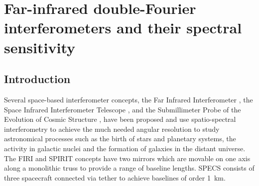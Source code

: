 
\chapter[Far-IR double-Fourier interferometers and their spectral sensitivity]{Far-infrared double-Fourier interferometers and their spectral sensitivity} %

\label{chap:phasenoisepaper} %


\section{Introduction}

Several space-based interferometer concepts, the Far Infrared Interferometer \citep[FIRI;][]{2009ExA....23..245H}, the Space Infrared Interferometer Telescope
\citep[SPIRIT;][]{Leisawitz:2007if}, and the Submillimeter Probe of the Evolution of Cosmic Structure \citep[SPECS;][]{Harwit:2006hl}, have been proposed and use spatio-spectral interferometry to achieve the much needed angular resolution to 
study astronomical processes such as the birth of stars and planetary systems, the activity in 
galactic nuclei and the formation of galaxies in the distant universe. The FIRI and SPIRIT concepts have
two mirrors which are movable on one axis along a monolithic truss to provide a range of baseline lengths.
SPECS consists of three spacecraft connected via tether to achieve baselines of order 1~km. 


